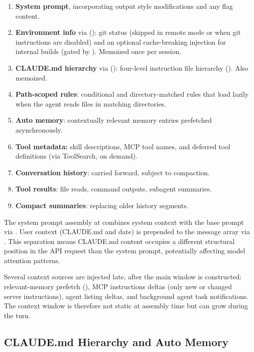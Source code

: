 \begin{enumerate}[nosep]
  \item \textbf{System prompt}, incorporating output style modifications and any  flag content.
  \item \textbf{Environment info} via  (): git status (skipped in remote mode or when git instructions are disabled) and an optional cache-breaking injection for internal builds (gated by ). Memoized once per session.
  \item \textbf{CLAUDE.md hierarchy} via  (): four-level instruction file hierarchy (). Also memoized.
  \item \textbf{Path-scoped rules}: conditional and directory-matched rules that load lazily when the agent reads files in matching directories.
  \item \textbf{Auto memory}: contextually relevant memory entries prefetched asynchronously.
  \item \textbf{Tool metadata:} skill descriptions, MCP tool names, and deferred tool definitions (via ToolSearch, on demand).
  \item \textbf{Conversation history}: carried forward, subject to compaction.
  \item \textbf{Tool results}: file reads, command outputs, subagent summaries.
  \item \textbf{Compact summaries}: replacing older history segments.
\end{enumerate}

The system prompt assembly at  combines system context with the base prompt via . User context (CLAUDE.md and date) is prepended to the message array via . This separation means CLAUDE.md content occupies a different structural position in the API request than the system prompt, potentially affecting model attention patterns.

Several context sources are injected late, after the main window is constructed: relevant-memory prefetch (), MCP instructions deltas (only new or changed server instructions), agent listing deltas, and background agent task notifications. The context window is therefore not static at assembly time but can grow during the turn.

\subsection{CLAUDE.md Hierarchy and Auto Memory}
\label{sec:context:claudemd}

